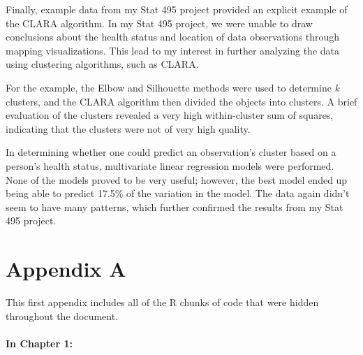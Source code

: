 \documentclass[12pt,twoside]{amherstthesis}
\begin{document}
  Finally, example data from my Stat 495 project provided an explicit
  example of the CLARA algorithm. In my Stat 495 project, we were unable
  to draw conclusions about the health status and location of data
  observations through mapping visualizations. This lead to my interest in
  further analyzing the data using clustering algorithms, such as CLARA.
  
  For the example, the Elbow and Silhouette methods were used to determine
  \emph{k} clusters, and the CLARA algorithm then divided the objects into
  clusters. A brief evaluation of the clusters revealed a very high
  within-cluster sum of squares, indicating that the clusters were not of
  very high quality.
  
  In determining whether one could predict an observation's cluster based
  on a person's health status, multivariate linear regression models were
  performed. None of the models proved to be very useful; however, the
  best model ended up being able to predict 17.5\% of the variation in the
  model. The data again didn't seem to have many patterns, which further
  confirmed the results from my Stat 495 project.
  
  \appendix
  
  \singlespacing
  
  \chapter{Appendix A}\label{appendix-a}
  
  This first appendix includes all of the R chunks of code that were
  hidden throughout the document.
  
  \subsubsection{In Chapter 1:}\label{in-chapter-1}
  
  \begin{Shaded}
  \begin{Highlighting}[]
  \NormalTok{(}\OperatorTok{!}
    \NormalTok{(}\NormalTok{, } \NormalTok{)}
  \NormalTok{(}\OperatorTok{!}
      \NormalTok{(}\NormalTok{, } \NormalTok{)}
  \NormalTok{(}\OperatorTok{!}
      \NormalTok{(}\NormalTok{, } \NormalTok{)}
  \NormalTok{(}\OperatorTok{!}
  \OperatorTok{::}\NormalTok{(}\NormalTok{)}
  \NormalTok{\}}
  \end{Highlighting}
  \end{Shaded}
  
\end{document}
